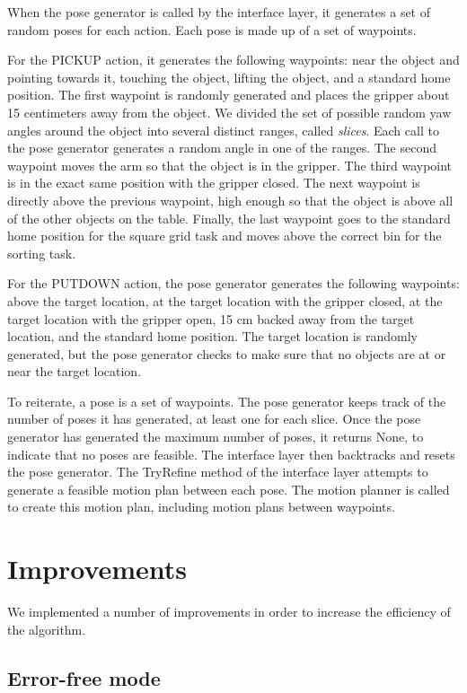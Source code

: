 \documentclass[12pt]{article}
\begin{document}
When the pose generator is called by the interface layer, it generates a set of random poses for each action. 
Each pose is made up of a set of waypoints. 

For the PICKUP action, it generates the following waypoints: near the object and pointing towards it, touching the object, lifting the object, and a standard home position. 
The first waypoint is randomly generated and places the gripper about 15 centimeters away from the object.
We divided the set of possible random yaw angles around the object into several distinct ranges, called \textit{slices}. 
Each call to the pose generator generates a random angle in one of the ranges.
The second waypoint moves the arm so that the object is in the gripper. 
The third waypoint is in the exact same position with the gripper closed. 
The next waypoint is directly above the previous waypoint, high enough so that the object is above all of the other objects on the table. 
Finally, the last waypoint goes to the standard home position for the square grid task and moves  above the correct bin for the sorting task.

For the PUTDOWN action, the pose generator generates the following waypoints: above the target location, at the target location with the gripper closed, at the target location with the gripper open, 15 cm backed away from the target location, and the standard home position. 
The target location is randomly generated, but the pose generator checks to make sure that no objects are at or near the target location.

To reiterate, a pose is a set of waypoints. 
The pose generator keeps track of the number of poses it has generated, at least one for each slice. 
Once the pose generator has generated the maximum number of poses, it returns None, to indicate that no poses are feasible. 
The interface layer then backtracks and resets the pose generator. 
The TryRefine method of the interface layer attempts to generate a feasible motion plan between each pose.  
The motion planner is called to create this motion plan, including motion plans between waypoints.

\section{Improvements}

We implemented a number of improvements in order to increase the efficiency of the algorithm.

\subsection{Error-free mode}
\end{document}
